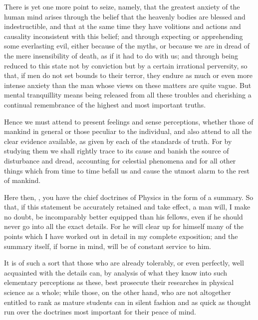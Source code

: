 \documentclass{stex}
\begin{document}
There is yet one more point to seize, namely, that the greatest anxiety of the human mind arises through the belief that the heavenly bodies are blessed and indestructible, and that at the same time they have volitions and actions and causality inconsistent with this belief; and through expecting or apprehending some everlasting evil, either because of the myths, or because we are in dread of the mere insensibility of death, as if it had to do with us; and through being reduced to this state not by conviction but by a certain irrational perversity, so that, if men do not set bounds to their terror, they endure as much or even more intense anxiety than the man whose views on these matters are quite vague.
But mental tranquillity means being released from all these troubles and cherishing a continual remembrance of the highest and most important truths.

Hence we must attend to present feelings and sense perceptions, whether those of mankind in general or those peculiar to the individual, and also attend to all the clear evidence available, as given by each of the standards of truth.
For by studying them we shall rightly trace to its cause and banish the source of disturbance and dread, accounting for celestial phenomena and for all other things which from time to time befall us and cause the utmost alarm to the rest of mankind.

Here then, , you have the chief doctrines of Physics in the form of a summary.
So that, if this statement be accurately retained and take effect, a man will, I make no doubt, be incomparably better equipped than his fellows, even if he should never go into all the exact details.
For he will clear up for himself many of the points which I have worked out in detail in my complete exposition; and the summary itself, if borne in mind, will be of constant service to him.

It is of such a sort that those who are already tolerably, or even perfectly, well acquainted with the details can, by analysis of what they know into such elementary perceptions as these, best prosecute their researches in physical science as a whole; while those, on the other hand, who are not altogether entitled to rank as mature students can in silent fashion and as quick as thought run over the doctrines most important for their peace of mind.
\end{document}
